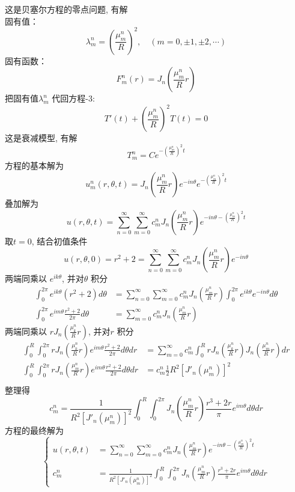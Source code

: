 	这是贝塞尔方程的零点问题, 有解 \\
	固有值：
	\[\lambda_m ^n =(\frac{\mu_{m}^{n}}{R})^2, \quad (m=0, \pm 1, \pm 2,\cdots) \]
	固有函数：\[F_m ^n(r) = J_n (\frac{\mu_{m}^{n}}{R}r) \]
	把固有值$ \lambda_m ^n  $ 代回方程-3: \begin{equation*}
		T'(t)+(\frac{\mu_{m}^{n}}{R})^2 T(t)=0 
	\end{equation*}	
	这是衰减模型, 有解
	\begin{equation*}
		T_m ^n=Ce^{- (\frac{\mu_{m}^{n}}{R})^2 t}
	\end{equation*}
	方程的基本解为
	$$u_m ^n(r,\theta,t) = J_n (\frac{\mu_{m}^{n}}{R}r) e^{-i n \theta} e^{- (\frac{\mu_{m}^{n}}{R})^2 t}$$
	叠加解为
	$$u(r,\theta,t) = \sum_{n=0}^{\infty} \sum_{m=0}^{\infty} c_m ^n J_n (\frac{\mu_{m}^{n}}{R}r) e^{-i n \theta - (\frac{\mu_{m}^{n}}{R})^2 t}$$
	取$t=0$, 结合初值条件
	$$u(r,\theta,0) = r^2 +2  = \sum_{n=0}^{\infty} \sum_{m=0}^{\infty} c_m ^n J_n (\frac{\mu_{m}^{n}}{R}r) e^{-i n \theta }$$
	两端同乘以 $e^{i k \theta }$, 并对$\theta$ 积分
	\[
	\begin{aligned}
	\int _0 ^{2\pi} e^{i k \theta } (r^2 +2) d\theta & = \sum_{n=0}^{\infty} \sum_{m=0}^{\infty} c_m ^n  J_n (\frac{\mu_{m}^{n}}{R}r) \int_0 ^{2\pi} e^{i k \theta } e^{-i n \theta}  d\theta \\ 
	\int _0 ^{2\pi} e^{i m \theta } \frac{r^2 +2}{2\pi} d\theta & = \sum_{m=0}^{\infty} c_m ^n J_n (\frac{\mu_{m}^{n}}{R}r)
	\end{aligned}\]
	两端同乘以 $ r J_n (\frac{\mu_{k}^{n}}{R}r)$, 并对$r$ 积分
	\[ \begin{aligned}
		\int _0 ^{R} \int _0 ^{2\pi} r J_n (\frac{\mu_{k}^{n}}{R}r) e^{i m \theta } \frac{r^2 +2}{2\pi} d\theta dr & = \sum_{m=0}^{\infty} c_m ^n \int _0 ^{R}   r J_n (\frac{\mu_{k}^{n}}{R}r) J_n (\frac{\mu_{m}^{n}}{R}r) dr \\
		\int _0 ^{R} \int _0 ^{2\pi} r J_n (\frac{\mu_{m}^{n}}{R}r) e^{i m \theta } \frac{r^2 +2}{2\pi} d\theta dr & = c_m ^n \frac{1}{2} R^2 [J'_n(\mu_m ^n)]^2 \\
		\end{aligned}\]
	整理得
	\[c_m ^n = \frac{1}{R^2 [J'_n(\mu_m ^n)]^2} \int _0 ^{R} \int _0 ^{2\pi}  J_n (\frac{\mu_{m}^{n}}{R}r)\frac{r^3 +2r}{\pi} e^{i m \theta }  d\theta dr \]
	方程的最终解为
	\[
	\left\{\begin{aligned}
		u(r,\theta,t) & = \sum_{n=0}^{\infty} \sum_{m=0}^{\infty} c_m ^n J_n (\frac{\mu_{m}^{n}}{R}r) e^{-i n \theta - (\frac{\mu_{m}^{n}}{R})^2 t} \\
		\\
		c_m ^n &= \frac{1}{R^2 [J'_n(\mu_m ^n)]^2} \int _0 ^{R} \int _0 ^{2\pi}  J_n (\frac{\mu_{m}^{n}}{R}r)\frac{r^3 +2r}{\pi} e^{i m \theta }  d\theta dr 
	\end{aligned}\right. \]


